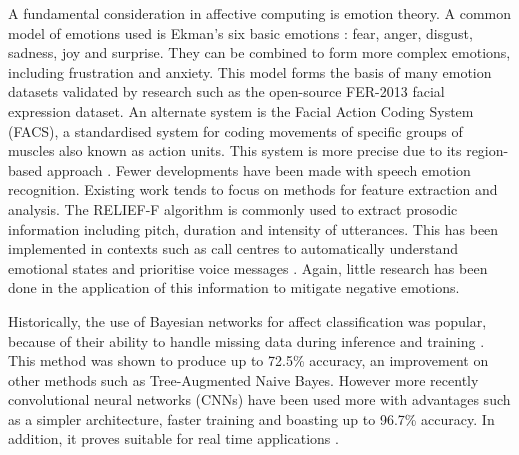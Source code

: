 \documentclass[12pt,a4paper]{article}
\begin{document}
A fundamental consideration in affective computing is emotion theory. A common model of emotions used is Ekman's six basic emotions \cite{ekman1992argument}: fear, anger, disgust, sadness, joy and surprise. They can be combined to form more complex emotions, including frustration and anxiety. This model forms the basis of many emotion datasets validated by research such as the open-source FER-2013 facial expression dataset. An alternate system is the Facial Action Coding System (FACS), a standardised system for coding movements of specific groups of muscles also known as action units. This system is more precise due to its region-based approach \cite{ekman2002facial}. Fewer developments have been made with speech emotion recognition. Existing work tends to focus on methods for feature extraction and analysis. The RELIEF-F algorithm \cite{kononenko1994estimating} is commonly used to extract prosodic information including pitch, duration and intensity of utterances. This has been implemented in contexts such as call centres to automatically understand emotional states and prioritise voice messages \cite{petrushin1999emotion}. Again, little research has been done in the application of this information to mitigate negative emotions.

Historically, the use of Bayesian networks for affect classification was popular, because of their ability to handle missing data during inference and training \cite{cohen2003learning}. This method was shown to produce up to 72.5\% accuracy, an improvement on other methods such as Tree-Augmented Naive Bayes. However more recently convolutional neural networks (CNNs) have been used more with advantages such as a simpler architecture, faster training and boasting up to 96.7\% accuracy. In addition, it proves suitable for real time applications \cite{LOPES2017610}.
\end{document}

